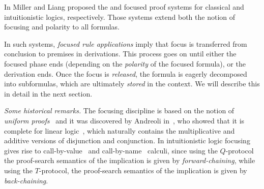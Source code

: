 In \cite{liang07csl,LiaMil09} Miller and Liang proposed the  \LKF and \LJF focused proof
systems for classical and intuitionistic logics, respectively.
%
Those systems 
extend both the notion of focusing and polarity to
all formulas. 

In such systems, {\em focused rule applications} imply that focus is transferred from conclusion to premises in derivations. This process goes on until either the focused phase ends (depending on the {\em polarity} of the focused formula), or the derivation ends.
Once the focus is \emph{released}, the formula is eagerly decomposed into subformulas, which are ultimately {\em stored} in the context. 
%
We will describe this in detail in the next section.

{\em Some historical remarks.} The focusing discipline is based on the notion of {\em uniform proofs}~\cite{miller91apal} and it was discovered by Andreoli in~\cite{andreoli92jlc}, who showed that it is complete for linear logic~\cite{DBLP:journals/tcs/Girard87}, which naturally contains the multiplicative and additive versions of disjunction and conjunction. In intuitionistic logic focusing gives rise to  call-by-value~\cite{dyckhoff06cie}  and call-by-name~\cite{herbelin94csl} calculi, since using the $Q$-protocol the proof-search semantics of the
implication is given by 
\emph{forward-chaining}, while using the $T$-protocol, the proof-search semantics of the
 implication is given by
\emph{back-chaining}.
